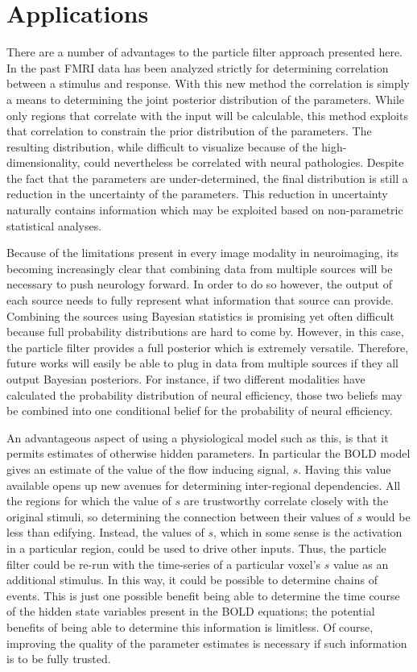 \section{Applications}
There are a number of advantages to the particle filter approach presented
here. In the past FMRI data has been analyzed strictly for determining
correlation between a stimulus and response. With this new method
the correlation is simply a means to determining the joint posterior distribution
of the parameters. While only regions that correlate with the input will 
be calculable, this method exploits that correlation to constrain the 
prior distribution of the parameters. The resulting distribution, while difficult 
to visualize because of the high-dimensionality, could nevertheless be 
correlated with neural pathologies. Despite the fact that the parameters
are under-determined, the final distribution is still a reduction in the
uncertainty of the parameters. This reduction in uncertainty naturally
contains information which may be exploited based on non-parametric 
statistical analyses. 

Because of the limitations present in every image modality in neuroimaging,
its becoming increasingly clear that combining data from multiple sources
will be necessary to push neurology forward. In order to do so however, the
output of each source needs to fully represent what information that source
can provide. Combining the sources using Bayesian statistics is promising
yet often difficult because full probability distributions are hard to come by.
However, in this case, the particle filter provides a full posterior which
is extremely versatile. Therefore, future works will easily be able to
plug in data from multiple sources if they all output Bayesian posteriors.
For instance, if two different modalities have calculated the probability
distribution of neural efficiency, those two beliefs may be combined into
one conditional belief for the probability of neural efficiency. 

An advantageous aspect of using a physiological model such as this, is that
it permits estimates of otherwise hidden parameters. In particular the BOLD
model gives an estimate of the value of the flow inducing signal, $s$. Having
this value available opens up new avenues for determining inter-regional
dependencies. All the regions for which the value of $s$ are trustworthy
correlate closely with the original stimuli, so determining the connection
between their values of $s$ would be less than edifying. Instead, the values
of $s$, which in some sense is the activation in a particular region, could
be used to drive other inputs. Thus, the particle filter could be re-run
with the time-series of a particular voxel's $s$ value as an additional stimulus.
In this way, it could be possible to determine chains of events. This is just
one possible benefit being able to determine the time course of the hidden
state variables present in the BOLD equations; the potential benefits of being
able to determine this information is limitless. Of course, improving the quality
of the parameter estimates is necessary if such information is to be fully
trusted. 


